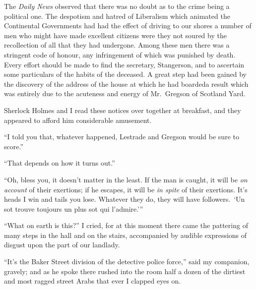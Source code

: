 \documentclass[12pt,english]{book}
\begin{document}
The \textit{Daily News} observed that there was no doubt as to the
crime being a political one. The despotism and hatred of Liberalism
which animated the Continental Governments had had the effect of driving
to our shores a number of men who might have made excellent citizens
were they not soured by the recollection of all that they had undergone.
Among these men there was a stringent code of honour, any infringement
of which was punished by death. Every effort should be made to find
the secretary, Stangerson, and to ascertain some particulars of the
habits of the deceased. A great step had been gained by the discovery
of the address of the house at which he had boarded\mdsh{---}a result
which was entirely due to the acuteness and energy of Mr.\ Gregson
of Scotland Yard.

Sherlock Holmes and I read these notices over together at breakfast,
and they appeared to afford him considerable amusement.

{}``I told you that, whatever happened, Lestrade and Gregson would
be sure to score.''

{}``That depends on how it turns out.''

{}``Oh, bless you, it doesn't matter in the least. If the man is
caught, it will be \textit{on account} of their exertions; if he escapes,
it will be \textit{in spite} of their exertions. It's heads I win
and tails you lose. Whatever they do, they will have followers.\ 
`Un sot trouve toujours un plus sot qui l'admire.'''

{}``What on earth is this?'' I cried, for at this moment there came
the pattering of many steps in the hall and on the stairs, accompanied
by audible expressions of disgust upon the part of our landlady.

{}``It's the Baker Street division of the detective police force,''
said my companion, gravely; and as he spoke there rushed into the
room half a dozen of the dirtiest and most ragged street Arabs that
ever I clapped eyes on.
\end{document}
